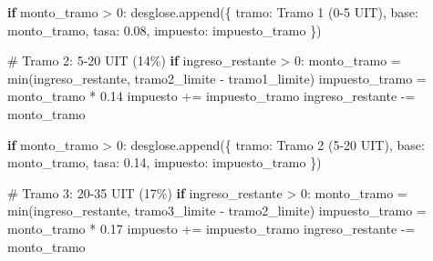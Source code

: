\documentclass[
  doc,
  floatsintext,
  longtable,
  a4paper,
  nolmodern,
  notxfonts,
  notimes,
  12pt,
  colorlinks=true,linkcolor=blue,citecolor=blue,urlcolor=blue]{apa7}
\newenvironment{Shaded}{\begin{snugshade}}{\end{snugshade}}
\newcommand{\BuiltInTok}[1]{\textcolor[rgb]{0.00,0.23,0.31}{#1}}
\newcommand{\CommentTok}[1]{\textcolor[rgb]{0.37,0.37,0.37}{#1}}
\newcommand{\ControlFlowTok}[1]{\textcolor[rgb]{0.00,0.23,0.31}{\textbf{#1}}}
\newcommand{\DecValTok}[1]{\textcolor[rgb]{0.68,0.00,0.00}{#1}}
\newcommand{\FloatTok}[1]{\textcolor[rgb]{0.68,0.00,0.00}{#1}}
\newcommand{\NormalTok}[1]{\textcolor[rgb]{0.00,0.23,0.31}{#1}}
\newcommand{\OperatorTok}[1]{\textcolor[rgb]{0.37,0.37,0.37}{#1}}
\newcommand{\StringTok}[1]{\textcolor[rgb]{0.13,0.47,0.30}{#1}}
\begin{document}
\begin{Shaded}
\begin{Highlighting}[]
            \ControlFlowTok{if}\NormalTok{ monto\_tramo }\OperatorTok{\textgreater{}} \DecValTok{0}\NormalTok{:}
\NormalTok{                desglose.append(\{}
                    \StringTok{\textquotesingle{}tramo\textquotesingle{}}\NormalTok{: }\StringTok{\textquotesingle{}Tramo 1 (0{-}5 UIT)\textquotesingle{}}\NormalTok{,}
                    \StringTok{\textquotesingle{}base\textquotesingle{}}\NormalTok{: monto\_tramo,}
                    \StringTok{\textquotesingle{}tasa\textquotesingle{}}\NormalTok{: }\FloatTok{0.08}\NormalTok{,}
                    \StringTok{\textquotesingle{}impuesto\textquotesingle{}}\NormalTok{: impuesto\_tramo}
\NormalTok{                \})}
        
        \CommentTok{\# Tramo 2: 5{-}20 UIT (14\%)}
        \ControlFlowTok{if}\NormalTok{ ingreso\_restante }\OperatorTok{\textgreater{}} \DecValTok{0}\NormalTok{:}
\NormalTok{            monto\_tramo }\OperatorTok{=} \BuiltInTok{min}\NormalTok{(ingreso\_restante, tramo2\_limite }\OperatorTok{{-}}\NormalTok{ tramo1\_limite)}
\NormalTok{            impuesto\_tramo }\OperatorTok{=}\NormalTok{ monto\_tramo }\OperatorTok{*} \FloatTok{0.14}
\NormalTok{            impuesto }\OperatorTok{+=}\NormalTok{ impuesto\_tramo}
\NormalTok{            ingreso\_restante }\OperatorTok{{-}=}\NormalTok{ monto\_tramo}
            
            \ControlFlowTok{if}\NormalTok{ monto\_tramo }\OperatorTok{\textgreater{}} \DecValTok{0}\NormalTok{:}
\NormalTok{                desglose.append(\{}
                    \StringTok{\textquotesingle{}tramo\textquotesingle{}}\NormalTok{: }\StringTok{\textquotesingle{}Tramo 2 (5{-}20 UIT)\textquotesingle{}}\NormalTok{,}
                    \StringTok{\textquotesingle{}base\textquotesingle{}}\NormalTok{: monto\_tramo,}
                    \StringTok{\textquotesingle{}tasa\textquotesingle{}}\NormalTok{: }\FloatTok{0.14}\NormalTok{,}
                    \StringTok{\textquotesingle{}impuesto\textquotesingle{}}\NormalTok{: impuesto\_tramo}
\NormalTok{                \})}
        
        \CommentTok{\# Tramo 3: 20{-}35 UIT (17\%)}
        \ControlFlowTok{if}\NormalTok{ ingreso\_restante }\OperatorTok{\textgreater{}} \DecValTok{0}\NormalTok{:}
\NormalTok{            monto\_tramo }\OperatorTok{=} \BuiltInTok{min}\NormalTok{(ingreso\_restante, tramo3\_limite }\OperatorTok{{-}}\NormalTok{ tramo2\_limite)}
\NormalTok{            impuesto\_tramo }\OperatorTok{=}\NormalTok{ monto\_tramo }\OperatorTok{*} \FloatTok{0.17}
\NormalTok{            impuesto }\OperatorTok{+=}\NormalTok{ impuesto\_tramo}
\NormalTok{            ingreso\_restante }\OperatorTok{{-}=}\NormalTok{ monto\_tramo}
            

\end{Highlighting}
\end{Shaded}
\end{document}
